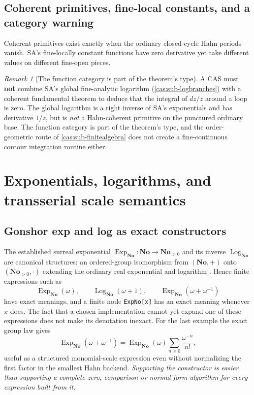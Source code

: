 \documentclass[11pt,letterpaper]{article}
\numberwithin{equation}{section}
\theoremstyle{definition}
\theoremstyle{remark}
\newtheorem{remark}[theorem]{Remark}
\newcommand{\No}{\mathbf{No}}
\newcommand{\ExpNo}{\operatorname{Exp}_{\No}}
\newcommand{\LogNo}{\operatorname{Log}_{\No}}
\begin{document}
\subsection{Coherent primitives, fine-local constants, and a category warning}
\label{cas:sub-categorywarning}
Coherent primitives exist exactly when the ordinary closed-cycle Hahn periods
vanish. SA's fine-locally constant functions have zero derivative yet take
different values on different fine-open pieces.

\begin{remark}[The function category is part of the theorem's type]
\label{cas:rem-category}
A CAS must \textbf{not} combine SA's global fine-analytic logarithm
(\cref{cas:sub-logbranches}) with a coherent fundamental theorem to deduce that
the integral of $dz/z$ around a loop is zero. The global logarithm is a right
inverse of SA's exponentials and has derivative $1/z$, but is \emph{not} a
Hahn-coherent primitive on the punctured ordinary base. The function category is
part of the theorem's type, and the order-geometric route of
\cref{cas:sub-finitealgebra} does not create a fine-continuous contour
integration routine either.
\end{remark}

\section{Exponentials, logarithms, and transserial scale semantics}
\label{cas:sec-transcendental}

\subsection{Gonshor exp and log as exact constructors}
\label{cas:sub-gonshor}
The established surreal exponential $\ExpNo:\No\to\No_{>0}$ and its inverse
$\LogNo$ are canonical structures: an ordered-group isomorphism from $(\No,+)$
onto $(\No_{>0},\cdot)$ extending the ordinary real exponential and logarithm
\cite{cas:Gonshor,cas:vdDE}. Hence finite expressions such as
\[
 \ExpNo(\omega),\qquad \LogNo(\omega+1),\qquad \ExpNo(\omega+\omega^{-1})
\]
have exact meanings, and a finite node \texttt{ExpNo[x]} has an exact meaning
whenever $x$ does. The fact that a chosen implementation cannot yet expand one
of these expressions does not make its denotation inexact. For the last example
the exact group law gives
\begin{equation}\label{cas:eq-expgroup}
 \ExpNo(\omega+\omega^{-1})=\ExpNo(\omega)\sum_{n\ge0}\frac{\omega^{-n}}{n!},
\end{equation}
useful as a structured monomial-scale expression even without normalizing the
first factor in the smallest Hahn backend. \emph{Supporting the constructor is
easier than supporting a complete zero, comparison or normal-form algorithm for
every expression built from it.}
\end{document}

